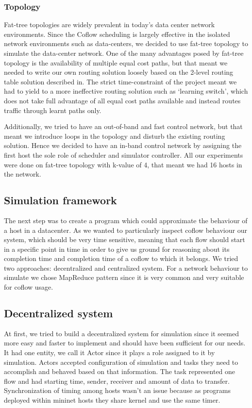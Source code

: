 \documentclass[conference]{IEEEtran}
\begin{document}
\subsubsection{Topology}
Fat-tree topologies are widely prevalent in today’s data center network environments. Since the Coflow scheduling is largely effective in the isolated network environments such as data-centers, we decided to use fat-tree topology to simulate the data-center network. One of the many advantages posed by fat-tree topology is the availability of multiple equal cost paths, but that meant we needed to write our own routing solution loosely based on the 2-level routing table solution described in. The strict time-constraint of the project meant we had to yield to a more ineffective routing solution such as ‘learning switch’, which does not take full advantage of all equal cost paths available and instead routes traffic through learnt paths only. 

Additionally, we tried to have an out-of-band and fast control network, but that meant we introduce loops in the topology and disturb the existing routing solution. Hence we decided to have an in-band control network by assigning the first host the sole role of scheduler and simulator controller. All our experiments were done on fat-tree topology with k-value of 4, that meant we had 16 hosts in the network.

\subsection{Simulation framework}
The next step was to create a program which could approximate the behaviour of a host in a datacenter. As we wanted to particularly inspect coflow behaviour our system, which should be very time sensitive, meaning that each flow should start in a specific point in time in order to give us ground for reasoning about its completion time and completion time of a coflow to which it belongs. We tried two approaches: decentralized and centralized system. For a network behaviour to simulate we chose MapReduce pattern since it is very common and very suitable for coflow usage.

\subsection{Decentralized system}
At first, we tried to build a decentralized system for simulation since it seemed more easy and faster to implement and should have been sufficient for our needs. It had one entity, we call it Actor since it plays a role assigned to it by simulation. Actors accepted configuration of simulation and tasks they need to accomplish and behaved based on that information. The task represented one flow and had starting time, sender, receiver and amount of data to transfer. Synchronization of timing among hosts wasn’t an issue because as programs deployed within mininet hosts they share kernel and use the same timer. 
\end{document}
